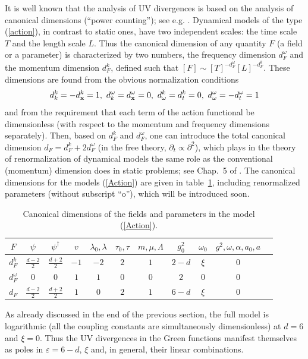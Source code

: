 \documentclass[12pt]{article}
\begin{document}
It is well known that the analysis of UV divergences is based on the analysis
of canonical dimensions (``power counting''); see e.g. \cite{Zinn,Book3}.
Dynamical models of the type (\ref{action}), in contrast to static ones, have
two independent scales: the time scale $T$ and the length scale $L$. Thus
the canonical dimension of any quantity $F$ (a field or a parameter) is
characterized by two numbers, the
frequency dimension $d_{F}^{\omega}$ and the momentum dimension $d_{F}^{k}$,
defined such that $[F] \sim [T]^{-d_{F}^{\omega}} [L]^{-d_{F}^{k}}$. These
dimensions are found from the obvious normalization conditions
\[ d_k^k=-d_{\bf x}^k=1,\ d_k^{\omega} =d_{\bf x}^{\omega }=0,\
d_{\omega }^k=d_t^k=0, \ d_{\omega }^{\omega }=-d_t^{\omega }=1 \]
and from the requirement
that each term of the action functional be dimensionless (with
respect to the momentum and frequency dimensions separately).
Then, based on $d_{F}^{k}$ and $d_{F}^{\omega}$,
one can introduce the total canonical dimension
$d_{F}=d_{F}^{k}+2d_{F}^{\omega}$ (in the free theory,
$\partial_{t}\propto\partial^{2}$), which plays in the theory of
renormalization of dynamical models the same role as
the conventional (momentum) dimension does in static problems;
see Chap.~5 of \cite{Book3}.
The canonical dimensions for the models (\ref{Action})
are given in table~\ref{table1}, including renormalized parameters (without
subscript ``o''), which will be introduced soon.
\begin{table}[h!]
\caption{Canonical dimensions of the fields and parameters in the model (\protect\ref{Action}).}
\label{table1}
\begin{center}
\begin{tabular}{|c|c|c|c|c|c|c|c|c|c|c|}
\hline
$F$          & $\psi$ & $\psi^\dagger$ & $v$ & $\lambda_0,\lambda$ & $\tau_0,\tau$ & $ m,\mu,\Lambda$ & $g_0^2$ & $\omega_0$ & $g^2,\omega,\alpha,a_0,a$ \\
\hline
$d_F^k$      & $\frac{d-2}{2}$ & $\frac{d+2}{2}$ & $-1$ & $-2$ & $2$ & $1$ & $2-d$ & $\xi$ & $0$ \\
\hline
$d_F^\omega$ & 0 & 0 & $1$ & $1$ & $0$ & $0$ & $2$ & $0$ & $0$ \\
\hline
$d_F$        & $\frac{d-2}{2}$ & $\frac{d+2}{2}$ & $1$ & $0$ & $2$ & $1$ & $6-d$ & $\xi$ & $0$ \\
\hline
\end{tabular}
\end{center}
\end{table}

As already discussed in the end of the previous section, the full model is
logarithmic (all the coupling constants are simultaneously dimensionless) at
$d=6$ and $\xi=0$. Thus the UV divergences in the Green functions manifest
themselves as poles in $\varepsilon = 6-d$, $\xi$ and, in general, their linear
combinations.
\end{document}
